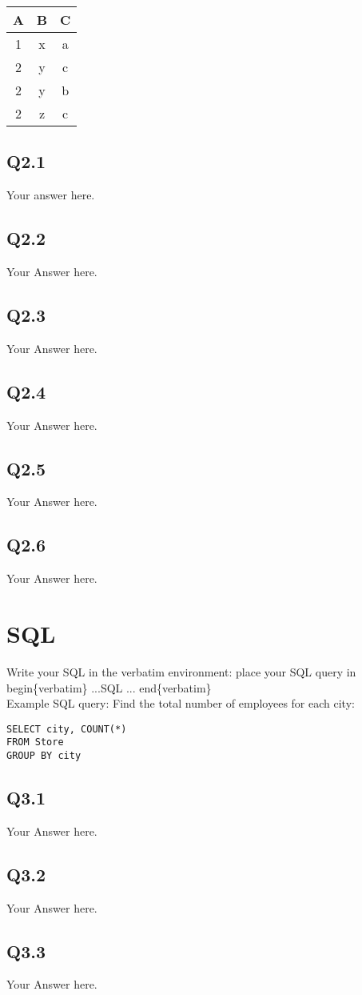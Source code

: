 \documentclass{article}
\begin{document}
\begin{center}
\begin{tabular}{ |c|c|c| } 
 \hline
 A & B & C  \\ 
 \hline
 1 & x & a \\ 
 \hline
 2 & y & c\\ 
 \hline
 2 & y & b\\ 
 \hline
 2 & z & c\\ 
 \hline
\end{tabular}
\end{center}

\subsection{Q2.1}
Your answer here.


\subsection{Q2.2}
Your Answer here.


\subsection{Q2.3}
Your Answer here.


\subsection{Q2.4}
Your Answer here.


\subsection{Q2.5}
Your Answer here.



\subsection{Q2.6}
Your Answer here.


\newpage



\section{SQL}

Write your SQL in the verbatim environment: place your SQL query in\\  begin\{verbatim\} ...SQL ... end\{verbatim\}\\
Example SQL query: Find the total number of employees for each city:

\begin{verbatim}
SELECT city, COUNT(*)
FROM Store
GROUP BY city
\end{verbatim}

\subsection{Q3.1}
Your Answer here.


\subsection{Q3.2}
Your Answer here.


\subsection{Q3.3}
Your Answer here.
\end{document}
